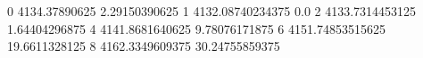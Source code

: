 0 4134.37890625 2.29150390625
1 4132.08740234375 0.0
2 4133.7314453125 1.64404296875
4 4141.8681640625 9.78076171875
6 4151.74853515625 19.6611328125
8 4162.3349609375 30.24755859375
